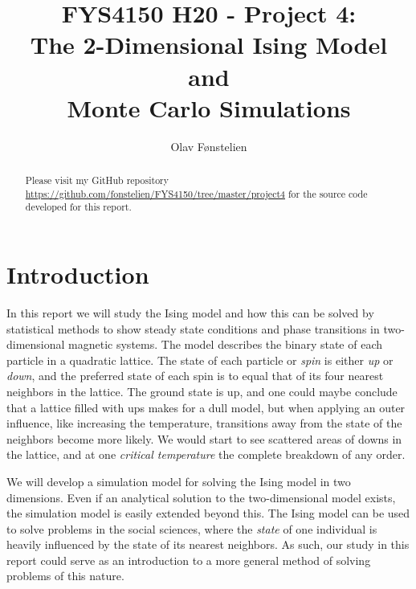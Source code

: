 \documentclass[]{article}
\title{FYS4150 H20 - Project 4:\\The 2-Dimensional Ising Model and \\Monte Carlo Simulations}
\author{Olav Fønstelien}
\begin{document}
\maketitle

\begin{abstract}


Please visit my GitHub repository \url{https://github.com/fonstelien/FYS4150/tree/master/project4} for the source code developed for this report.

\end{abstract}

\section{Introduction} \label{sec:intro}

In this report we will study the Ising model and how this can be solved by statistical methods to show steady state conditions and phase transitions in two-dimensional magnetic systems. The model describes the binary state of each particle in a quadratic lattice. The state of each particle or \textit{spin} is either \textit{up} or \textit{down}, and the preferred state of each spin is to equal that of its four nearest neighbors in the lattice. The ground state is up, and one could maybe conclude that a lattice filled with ups makes for a dull model, but when applying an outer influence, like increasing the temperature, transitions away from the state of the neighbors become more likely. We would start to see scattered areas of downs in the lattice, and at one \textit{critical temperature} the complete breakdown of any order.

We will develop a simulation model for solving the Ising model in two dimensions. Even if an analytical solution to the two-dimensional model exists, the simulation model is easily extended beyond this. The Ising model can be used to solve problems in the social sciences, where the \textit{state} of one individual is heavily influenced by the state of its nearest neighbors. As such, our study in this report could serve as an introduction to a more general method of solving problems of this nature.
\end{document}
